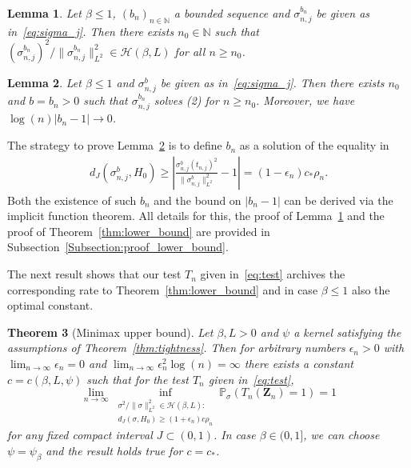 \documentclass[10.5pt,letter]{article}
\numberwithin{equation}{section}
\newtheorem{theorem}{Theorem}[section]
\newtheorem{lemma}[theorem]{Lemma}
\theoremstyle{definition}
\newcommand{\N}{\mathbb{N}}
\renewcommand{\P}{\mathbb{P}}
\newcommand{\1}{\mathbbm{1}}
\begin{document}
\begin{lemma}\label{lemma:hypotheses_Hölder}
    Let $\beta\leq 1$, $(b_n)_{n\in\N}$ a bounded sequence and $\sigma_{n,j}^{b_n}$ be given as in~\eqref{eq:sigma_j}. Then there exists $n_0\in\N$ such that $(\sigma_{n,j}^{b_n})^2/\|\sigma_{n,j}^{b_n}\|_{L^2}^2 \in\mathcal{H}(\beta,L)$ for all $n\geq n_0$.
\end{lemma}


\begin{lemma}\label{lemma:hypotheses_solution}
    Let $\beta\leq 1$ and $\sigma_{n,j}^b$ be given as in~\eqref{eq:sigma_j}. Then there exists $n_0$ and $b=b_n>0$ such that $\sigma_{n,j}^{b_n}$ solves (2) for $n\geq n_0$. Moreover, we have $\log(n)|b_n-1|\rightarrow 0$.
\end{lemma}

The strategy to prove Lemma~\ref{lemma:hypotheses_solution} is to define $b_n$ as a solution of the equality in
\begin{align}\label{eq_proof:hypotheses_solution1}
    d_J(\sigma_{n,j}^b,H_0) \geq \left|\frac{\sigma_{n,j}^b(t_{n,j})^2}{\|\sigma_{n,j}^b\|_{L^2}^2} -1\right| = (1-\epsilon_n)c_*\rho_n.
\end{align}  
Both the existence of such $b_n$ and the bound on $|b_n-1|$ can be derived via the implicit function theorem. All details for this, the proof of Lemma~\ref{lemma:hypotheses_Hölder} and the proof of Theorem~\ref{thm:lower_bound} are provided in Subsection~\ref{Subsection:proof_lower_bound}. \smallskip


The next result shows that our test $T_n$ given in~\eqref{eq:test} archives the corresponding rate to Theorem~\ref{thm:lower_bound} and in case $\beta\leq 1$ also the optimal constant.

\begin{theorem}[Minimax upper bound]\label{thm:upper_bound}
   Let $\beta,L>0$ and $\psi$ a kernel satisfying the assumptions of Theorem~\ref{thm:tightness}. Then for arbitrary numbers $\epsilon_n>0$ with $\lim_{n\to\infty}\epsilon_n=0$ and $\lim_{n\to\infty} \epsilon_n^2\log(n)=\infty$ there exists a constant $c=c(\beta,L,\psi)$ such that for the test $T_n$ given in~\eqref{eq:test},
   \[ \lim_{n\to\infty} \inf_{ \substack{\sigma^2/\|\sigma\|_{L^2}^2\in\mathcal{H}(\beta,L):\\ d_J(\sigma, H_0)\geq (1+\epsilon_n)c\rho_n}}\P_\sigma\left( T_n(\mathbf{Z}_n) =1\right)=1\]
   for any fixed compact interval $J\subset (0,1)$. In case $\beta\in (0,1]$, we can choose $\psi=\psi_\beta$ and the result holds true for $c=c_*$.
\end{theorem}
\end{document}
